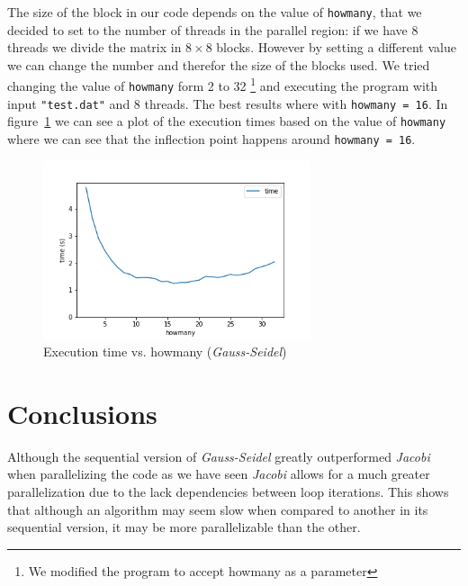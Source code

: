 
\pagebreak

The size of the block in our code depends on the value of \texttt{howmany}, that we decided to set to the
number of threads in the parallel region: if we have 8 threads we divide the matrix in $8\times 8$ blocks.
However by setting a different value we can change the number and therefor the size of the blocks used.
We tried changing the value of \texttt{howmany} form 2 to 32 
\footnote{We modified the program to accept howmany as a parameter}
and executing the program with input \texttt{"test.dat"} and 8 threads.
The best results where with \texttt{howmany = 16}. In figure~\ref{fig:howmany}
we can see a plot of the execution times based on the value of \texttt{howmany} where we can see that
the inflection point happens around \texttt{howmany = 16}.

\begin{figure}[H]
    \centering
    \includegraphics[width=0.7\textwidth]{figures/results}
    \caption{Execution time vs. howmany (\emph{Gauss-Seidel})}%
    \label{fig:howmany}
\end{figure}


\section{Conclusions}%
\label{sec:conclusions}


Although the sequential version of \emph{Gauss-Seidel} greatly outperformed \emph{Jacobi} when
parallelizing the code as we have seen \emph{Jacobi} allows for a much greater parallelization
due to the lack dependencies between loop iterations. This shows that although an algorithm may
seem slow when compared to another in its sequential version, it may be more parallelizable than
the other.


